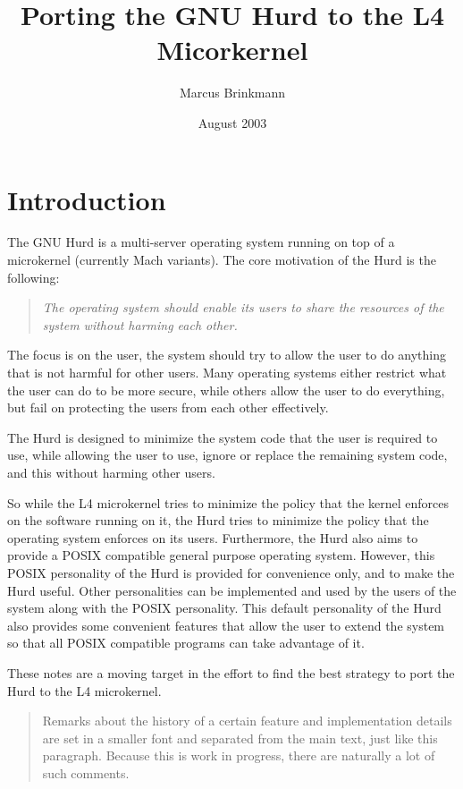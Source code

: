 \documentclass[9pt,a4paper]{extarticle}
\title{Porting the GNU Hurd to the L4 Micorkernel}
\author{Marcus Brinkmann}
\date{August 2003}
\newenvironment{comment}{\footnotesize \begin{quote}}{\end{quote}}
\begin{document}
\maketitle
\newpage
\tableofcontents
\newpage

\section{Introduction}

The GNU Hurd is a multi-server operating system running on top of a
microkernel (currently Mach variants).  The core motivation of the
Hurd is the following:

\begin{quote}
  \emph{The operating system should enable its users to share the
    resources of the system without harming each other.}
\end{quote}

The focus is on the user, the system should try to allow the user to
do anything that is not harmful for other users.  Many operating
systems either restrict what the user can do to be more secure, while
others allow the user to do everything, but fail on protecting the
users from each other effectively.

The Hurd is designed to minimize the system code that the user is
required to use, while allowing the user to use, ignore or replace the
remaining system code, and this without harming other users.

So while the L4 microkernel tries to minimize the policy that the
kernel enforces on the software running on it, the Hurd tries to
minimize the policy that the operating system enforces on its users.
Furthermore, the Hurd also aims to provide a POSIX compatible general
purpose operating system.  However, this POSIX personality of the Hurd
is provided for convenience only, and to make the Hurd useful.  Other
personalities can be implemented and used by the users of the system
along with the POSIX personality.  This default personality of the
Hurd also provides some convenient features that allow the user to
extend the system so that all POSIX compatible programs can take
advantage of it.

These notes are a moving target in the effort to find the best
strategy to port the Hurd to the L4 microkernel.

\begin{comment}
  Remarks about the history of a certain feature and implementation
  details are set in a smaller font and separated from the main text,
  just like this paragraph.  Because this is work in progress, there
  are naturally a lot of such comments.
\end{comment}
\end{document}
